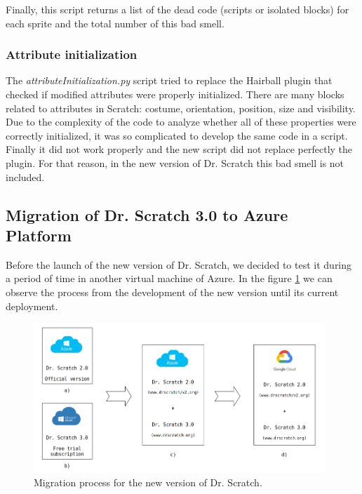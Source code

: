 Finally, this script returns a list of the dead code (scripts or isolated blocks) for each sprite and the total number of this bad smell.

\subsubsection{Attribute initialization}
\label{subsubsec:att_initialization}

The \textit{attributeInitialization.py} script tried to replace the Hairball plugin that checked if modified attributes were properly initialized. There are many blocks related to attributes in Scratch: costume, orientation, position, size and visibility. Due to the complexity of the code to analyze whether all of these properties were correctly initialized, it was so complicated to develop the same code in a script. Finally it did not work properly and the new script did not replace perfectly the plugin. For that reason, in the new version of Dr. Scratch this bad smell is not included.

\subsection{Migration of Dr. Scratch 3.0 to Azure Platform}
\label{subsec:mig_to_azure}

Before the launch of the new version of Dr. Scratch, we decided to test it during a period of time in another virtual machine of Azure. In the figure \ref{fig:migrations} we can observe the process from the development of the new version until its current deployment.

 \begin{figure}
    \centering
    \includegraphics[width=11cm,                         keepaspectratio]{img/migrations.png}
    \caption{Migration process for the new version of Dr. Scratch.}
    \label{fig:migrations}
\end{figure}


